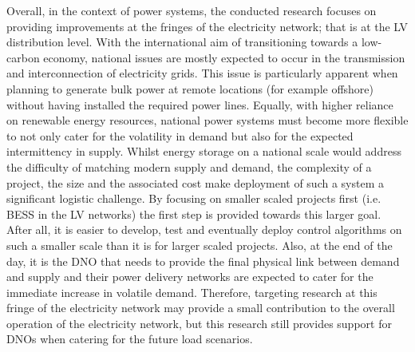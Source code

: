 Overall, in the context of power systems, the conducted research focuses on providing improvements at the fringes of the electricity network; that is at the LV distribution level.
With the international aim of transitioning towards a low-carbon economy, national issues are mostly expected to occur in the transmission and interconnection of electricity grids.
This issue is particularly apparent when planning to generate bulk power at remote locations (for example offshore) without having installed the required power lines.
Equally, with higher reliance on renewable energy resources, national power systems must become more flexible to not only cater for the volatility in demand but also for the expected intermittency in supply.
Whilst energy storage on a national scale would address the difficulty of matching modern supply and demand, the complexity of a project, the size and the associated cost make deployment of such a system a significant logistic challenge.
By focusing on smaller scaled projects first (i.e. BESS in the LV networks) the first step is provided towards this larger goal.
After all, it is easier to develop, test and eventually deploy control algorithms on such a smaller scale than it is for larger scaled projects.
Also, at the end of the day, it is the DNO that needs to provide the final physical link between demand and supply and their power delivery networks are expected to cater for the immediate increase in volatile demand.
Therefore, targeting research at this fringe of the electricity network may provide a small contribution to the overall operation of the electricity network, but this research still provides support for DNOs when catering for the future load scenarios.
